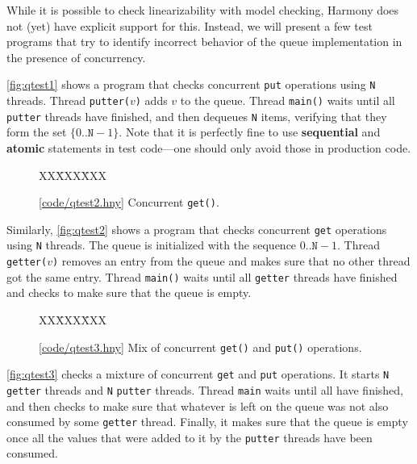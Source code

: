 \documentclass{report}
\newcommand{\harmonysource}[1]{
\begin{tabbing}
XX\=XXX\=XXX\kill
    
\end{tabbing}
}
\newcommand{\harmonylink}[1]{%
[\href{https://harmony.cs.cornell.edu/#1}{\underline{#1}}]%
}
\newenvironment{code}{
\tcolorbox
}{
\endtcolorbox
}
\begin{document}
While it is possible to check linearizability with
model checking, Harmony does not (yet) have explicit
support for this.  Instead, we will present a few test
programs that try to identify incorrect behavior of
the queue implementation in the presence of concurrency.

\autoref{fig:qtest1} shows a program that
checks concurrent \texttt{put} operations using
\texttt{N} threads.  Thread \texttt{putter($v$)}
adds $v$ to the queue.
Thread \texttt{main()} waits until all \texttt{putter}
threads have finished, and then dequeues \texttt{N}
items, verifying that they form the set
$\{ 0 .. \mathtt{N} - 1 \}$.
Note that it is perfectly fine to use \textbf{sequential}
and \textbf{atomic} statements in test code---one should
only avoid those in production code.

\begin{figure}
\begin{code}
\harmonysource{qtest2}
\end{code}
\caption{\harmonylink{code/qtest2.hny} Concurrent \texttt{get()}.}
\label{fig:qtest2}
\end{figure}

Similarly, \autoref{fig:qtest2} shows a program that
checks concurrent \texttt{get} operations using
\texttt{N} threads.
The queue is initialized with the sequence
$0 .. \mathtt{N} - 1$.
Thread \texttt{getter($v$)} removes an entry from the
queue and makes sure that no other thread got the
same entry.
Thread \texttt{main()} waits until all \texttt{getter}
threads have finished and checks to make sure that
the queue is empty.

\begin{figure}
\begin{code}
\harmonysource{qtest3}
\end{code}
\caption{\harmonylink{code/qtest3.hny} Mix of concurrent
\texttt{get()} and \texttt{put()} operations.}
\label{fig:qtest3}
\end{figure}

\autoref{fig:qtest3} checks a mixture of
concurrent \texttt{get} and \texttt{put} operations.
It starts \texttt{N} \texttt{getter} threads and
\texttt{N} \texttt{putter} threads.
Thread \texttt{main} waits until all have finished,
and then checks to make sure that whatever is left
on the queue was not also consumed by some
\texttt{getter} thread.
Finally, it makes sure that the queue is empty
once all the values that were added
to it by the \texttt{putter} threads have been consumed.
\end{document}
